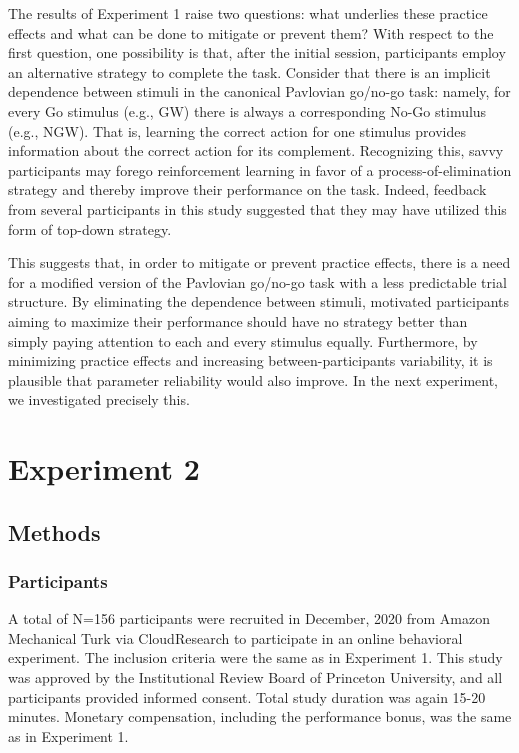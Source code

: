 \documentclass[a4paper,12pt]{article}
\begin{document}
\begin{refsection}[main]
The results of Experiment 1 raise two questions: what underlies these practice effects and what can be done to mitigate or prevent them? With respect to the first question, one possibility is that, after the initial session, participants employ an alternative strategy to complete the task. Consider that there is an implicit dependence between stimuli in the canonical Pavlovian go/no-go task: namely, for every Go stimulus (e.g., GW) there is always a corresponding No-Go stimulus (e.g., NGW). That is, learning the correct action for one stimulus provides information about the correct action for its complement. Recognizing this, savvy participants may forego reinforcement learning in favor of a process-of-elimination strategy and thereby improve their performance on the task. Indeed, feedback from several participants in this study suggested that they may have utilized this form of top-down strategy.  

This suggests that, in order to mitigate or prevent practice effects, there is a need for a modified version of the Pavlovian go/no-go task with a less predictable trial structure. By eliminating the dependence between stimuli, motivated participants aiming to maximize their performance should have no strategy better than simply paying attention to each and every stimulus equally. Furthermore, by minimizing practice effects and increasing between-participants variability, it is plausible that parameter reliability would also improve. In the next experiment, we investigated precisely this.

\section*{Experiment 2}

\subsection*{Methods}

\subsubsection*{Participants}

A total of N=156 participants were recruited in December, 2020 from Amazon Mechanical Turk via CloudResearch \cite{litman2017turkprime} to participate in an online behavioral experiment. The inclusion criteria were the same as in Experiment 1. This study was approved by the Institutional Review Board of Princeton University, and all participants provided informed consent. Total study duration was again 15-20 minutes. Monetary compensation, including the performance bonus, was the same as in Experiment 1. 


\end{refsection}
\end{document}
